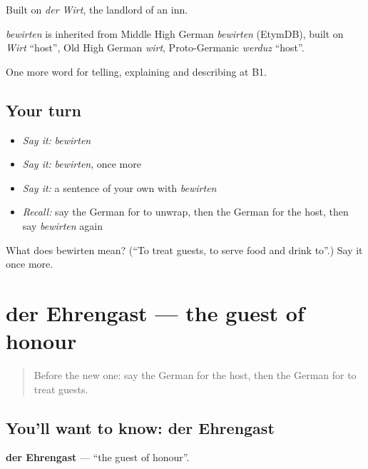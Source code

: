 Built on \emph{der Wirt}, the landlord of an inn.

\begin{cousinweb}
\emph{bewirten} is inherited from Middle High German \emph{bewirten} (EtymDB), built on \emph{Wirt} \textquotedblleft{}host\textquotedblright{}, Old High German \emph{wirt}, Proto-Germanic \emph{werduz} \textquotedblleft{}host\textquotedblright{}.
\end{cousinweb}

\begin{grammarlens}[title={What you've built}]
One more word for telling, explaining and describing at B1.
\end{grammarlens}

\subsection*{Your turn}
\begin{itemize}
\raggedright
  \item \emph{Say it:} \emph{bewirten}
  \item \emph{Say it:} \emph{bewirten}, once more
  \item \emph{Say it:} a sentence of your own with \emph{bewirten}
  \item \emph{Recall:} say the German for to unwrap, then the German for the host, then say \emph{bewirten} again
\end{itemize}

\begin{tcolorbox}[breakable,colback=teal!4,colframe=teal!35!black,title={Before you move on}]
What does bewirten mean? (\textquotedblleft{}To treat guests, to serve food and drink to\textquotedblright{}.) Say it once more.
\end{tcolorbox}
\section[der Ehrengast]{der Ehrengast — the guest of honour}

\label{lesson:GE-C307-ehrengast}



\begin{quote}
Before the new one: say the German for the host, then the German for to treat guests.
\end{quote}

\subsection*{You'll want to know: der Ehrengast}
\textbf{der Ehrengast} — \textquotedblleft{}the guest of honour\textquotedblright{}.

